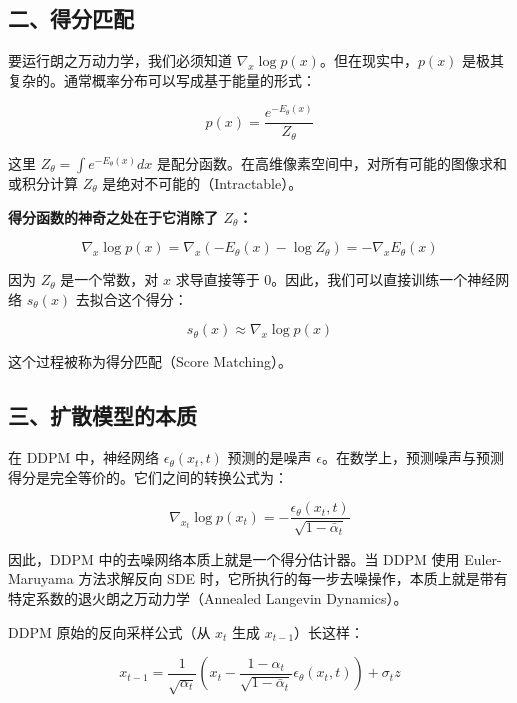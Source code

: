 \hypertarget{ux4e8cux5f97ux5206ux5339ux914d}{%
\subsection{二、得分匹配}\label{ux4e8cux5f97ux5206ux5339ux914d}}

要运行朗之万动力学，我们必须知道 \(\nabla_x\log p(x)\)。但在现实中，\(p(x)\) 是极其复杂的。通常概率分布可以写成基于能量的形式：

\[
p(x)=\frac{e^{-E_\theta(x)}}{Z_\theta}
\]

这里 \(Z_\theta=\int e^{-E_\theta(x)}dx\) 是配分函数。在高维像素空间中，对所有可能的图像求和或积分计算 \(Z_\theta\) 是绝对不可能的（Intractable）。

\textbf{得分函数的神奇之处在于它消除了 \(Z_\theta\)：}

\[
\nabla_x\log p(x)=\nabla_x(-E_\theta(x)-\log Z_\theta)=-\nabla_x E_\theta(x)
\]

因为 \(Z_\theta\) 是一个常数，对 \(x\) 求导直接等于 0。因此，我们可以直接训练一个神经网络 \(s_\theta(x)\) 去拟合这个得分：

\[
s_\theta(x)\approx\nabla_x\log p(x)
\]

这个过程被称为得分匹配（Score Matching）。

\hypertarget{ux4e09ux6269ux6563ux6a21ux578bux7684ux672cux8d28}{%
\subsection{三、扩散模型的本质}\label{ux4e09ux6269ux6563ux6a21ux578bux7684ux672cux8d28}}

在 DDPM 中，神经网络 \(\epsilon_\theta(x_t,t)\) 预测的是噪声 \(\epsilon\)。在数学上，预测噪声与预测得分是完全等价的。它们之间的转换公式为：

\[
\nabla_{x_t}\log p(x_t)=-\frac{\epsilon_\theta(x_t,t)}{\sqrt{1-\bar{\alpha}_t}}
\]

因此，DDPM 中的去噪网络本质上就是一个得分估计器。当 DDPM 使用 Euler-Maruyama 方法求解反向 SDE 时，它所执行的每一步去噪操作，本质上就是带有特定系数的退火朗之万动力学（Annealed Langevin Dynamics）。

DDPM 原始的反向采样公式（从 \(x_t\) 生成 \(x_{t-1}\)）长这样：

\[
x_{t-1}=\frac{1}{\sqrt{\alpha_t}}
\left(x_t-\frac{1-\alpha_t}{\sqrt{1-\bar{\alpha}_t}}\epsilon_\theta(x_t,t)\right)
+\sigma_t z
\]

